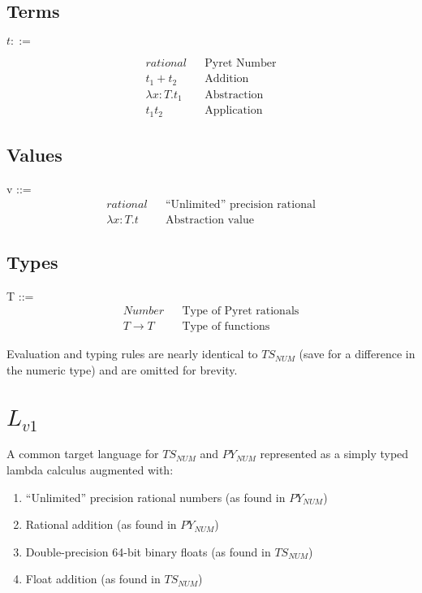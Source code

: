 \documentclass{article}
\begin{document}
	\subsection{Terms}
	$t ::=$
	
	\begin{align*}
	rational  									&& \text{Pyret Number} \\
	t_1 + t_2 									&& \text{Addition} \\
	\lambda x \colon T.t_1								&& \text{Abstraction} \\
	t_1 t_2										&& \text{Application}
	\end{align*}
	
	
	\subsection{Values}
	v ::=
	\begin{align*}
		rational							&& \text{``Unlimited'' precision rational} \\
		\lambda x \colon T.t						&& \text{Abstraction value}
	\end{align*}
	
	
	\subsection{Types}
	T ::=
	\begin{align*}
		Number												&& \text{Type of Pyret rationals}\\
		T \rightarrow T										&& \text{Type of functions}
	\end{align*}
		
	Evaluation and typing rules are nearly identical to $TS_{NUM}$ (save for a difference in the numeric type) and are omitted for brevity.


	\section{$L_{v1}$}
	A common target language for $TS_{NUM}$ and $PY_{NUM}$ represented as a simply typed lambda calculus augmented with:
	\begin{enumerate}
		\item ``Unlimited'' precision rational numbers (as found in $PY_{NUM}$)
		\item Rational addition (as found in $PY_{NUM}$)
		\item Double-precision 64-bit binary floats (as found in $TS_{NUM}$)
		\item Float addition (as found in $TS_{NUM}$)
	\end{enumerate}
\end{document}
